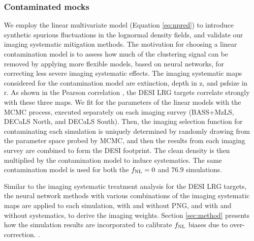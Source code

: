 \subsubsection{Contaminated mocks}
We employ the linear multivariate model (Equation \ref{eq:npred}) to introduce synthetic spurious fluctuations in the lognormal density fields, and validate our imaging systematic mitigation methods. The motivation for choosing a linear contamination model is to assess how much of the clustering signal can be removed by applying more flexible models, based on neural networks, for correcting less severe imaging systematic effects. The imaging systematic maps considered for the contamination model are extinction, depth in z, and psfsize in r. As shown in the Pearson correlation  , the DESI LRG targets correlate strongly with these three maps. We fit for the parameters of the linear models with the MCMC process, executed separately on each imaging survey (BASS+MzLS, DECaLS North, and DECaLS South). Then, the imaging selection function for contaminating each simulation is uniquely determined by randomly drawing from the parameter space probed by MCMC, and then the results from each imaging survey are combined to form the DESI footprint. The clean density is then multiplied by the contamination model to induce systematics.  The same contamination model is used for both the $f_{\rm NL}=0$ and $76.9$ simulations.

Similar to the imaging systematic treatment analysis for the DESI LRG targets, the neural network methods with various combinations of the imaging systematic maps are applied to each simulation, with and without PNG, and with and without systematics, to derive the imaging weights. Section \ref{sec:method} presents how the simulation results are incorporated to calibrate $f_{\rm NL}$ biases due to over-correction.  \cite[see, also,][]{rezaie2021primordial}. 